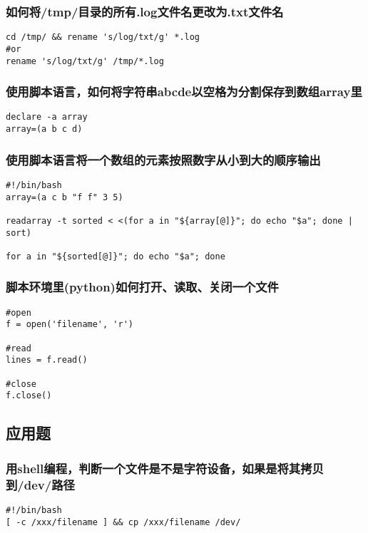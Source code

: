 \documentclass{article}
\begin{document}
\subsubsection{如何将/tmp/目录的所有.log文件名更改为.txt文件名}
\begin{verbatim}
cd /tmp/ && rename 's/log/txt/g' *.log
#or
rename 's/log/txt/g' /tmp/*.log
\end{verbatim}

\subsubsection{使用脚本语言，如何将字符串abcde以空格为分割保存到数组array里}
\begin{verbatim}
declare -a array
array=(a b c d)
\end{verbatim}


\subsubsection{使用脚本语言将一个数组的元素按照数字从小到大的顺序输出}
\begin{verbatim}
#!/bin/bash
array=(a c b "f f" 3 5)

readarray -t sorted < <(for a in "${array[@]}"; do echo "$a"; done | sort)

for a in "${sorted[@]}"; do echo "$a"; done

\end{verbatim}

\subsubsection{脚本环境里(python)如何打开、读取、关闭一个文件}
\begin{verbatim}
#open
f = open('filename', 'r')

#read
lines = f.read()

#close
f.close()

\end{verbatim}

\subsection{应用题}

\subsubsection{用shell编程，判断一个文件是不是字符设备，如果是将其拷贝到/dev/路径}
\begin{verbatim}
#!/bin/bash
[ -c /xxx/filename ] && cp /xxx/filename /dev/
\end{verbatim}
\end{document}

